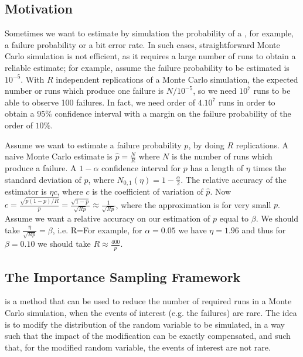 \subsection{Motivation} Sometimes we want to estimate by simulation the
probability of a , for example, a failure probability
or a bit error rate. In such cases, straightforward Monte Carlo
simulation is not efficient, as it requires a large number of runs
to obtain a reliable estimate; for example, assume the failure
probability to be estimated is $10^{-5}$. With $R$ independent
replications of a Monte Carlo simulation, the expected number or
runs which produce one failure is $N/10^{-5}$, so we need $10^7$
runs to be able to observe 100 failures. In fact, we need order of
$4 . 10^7$ runs in order to obtain a $95\%$ confidence interval with
a margin on the failure probability of the order of $10\%$.

Assume we want to estimate a failure probability $p$,
by doing $R$ replications. A naive Monte Carlo estimate is
$\hat{p}=\frac{N}{R}$ where $N$ is the number of runs which
produce a failure. A $1-\alpha$ confidence interval for $p$ has
a length of $\eta$ times the standard deviation of
$\hat{p}$, where $N_{0,1}(\eta)=1-\frac{\alpha}{2}$. The
relative accuracy of the estimator is $\eta c$, where $c$ is
the coefficient of variation of $\hat{p}$. Now $c =
\frac{\sqrt{p(1-p)/R}}{p}=\frac{\sqrt{1-p}}{\sqrt{Rp}}\approx
\frac{1}{\sqrt{Rp}} $,  where the approximation is for very
small $p$. Assume we want a relative accuracy on our estimation
of $p$ equal to $\beta$. We should take
$\frac{\eta}{\sqrt{Rp}}=\beta$, i.e. \be
R=\label{eq-is40}\ee For example, for
$\alpha=0.05$ we have $\eta=1.96$ and thus for $\beta=0.10$ we
should take $R\approx \frac{400}{p}$.
\subsection{The Importance Sampling Framework}
 is a method that can be used to reduce the
number of required runs in a Monte Carlo simulation, when the events
of interest (e.g. the failures) are rare. The idea is to modify the
distribution of the random variable to be simulated, in a way such
that the impact of the modification can be exactly compensated, and
such that, for the modified random variable, the events of interest
are not rare.

